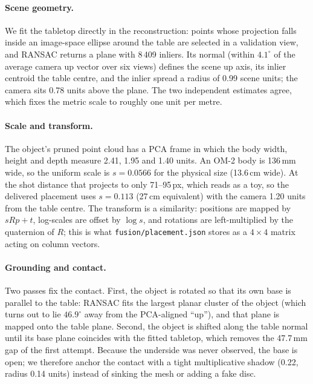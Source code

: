 \documentclass[10pt,twocolumn,letterpaper]{article}
\begin{document}
\paragraph{Scene geometry.} We fit the tabletop directly in the reconstruction: points whose
projection falls inside an image-space ellipse around the table are selected in a validation view,
and RANSAC returns a plane with 8\,409 inliers. Its normal (within $4.1^{\circ}$ of the average
camera up vector over six views) defines the scene up axis, its inlier centroid the table centre,
and the inlier spread a radius of 0.99 scene units; the camera sits 0.78 units above the plane.
The two independent estimates agree, which fixes the metric scale to roughly one unit per metre.

\paragraph{Scale and transform.} The object's pruned point cloud has a PCA frame in which the body
width, height and depth measure 2.41, 1.95 and 1.40 units. An OM-2 body is 136\,mm wide, so the
uniform scale is $s=0.0566$ for the physical size (13.6\,cm wide). At the shot distance that
projects to only 71--95\,px, which reads as a toy, so the delivered placement uses $s=0.113$
(27\,cm equivalent) with the camera 1.20 units from the table centre. The transform is a
similarity: positions are mapped by $sR p + t$, log-scales are offset by $\log s$, and rotations
are left-multiplied by the quaternion of $R$; this is what \texttt{fusion/placement.json} stores
as a $4\times4$ matrix acting on column vectors.

\paragraph{Grounding and contact.} Two passes fix the contact. First, the object is rotated so that
its own base is parallel to the table: RANSAC fits the largest planar cluster of the object (which
turns out to lie $46.9^{\circ}$ away from the PCA-aligned ``up''), and that plane is mapped onto
the table plane. Second, the object is shifted along the table normal until its base plane
coincides with the fitted tabletop, which removes the 47.7\,mm gap of the first attempt. Because
the underside was never observed, the base is open; we therefore anchor the contact with a tight
multiplicative shadow (0.22, radius 0.14 units) instead of sinking the mesh or adding a fake disc.
\end{document}
